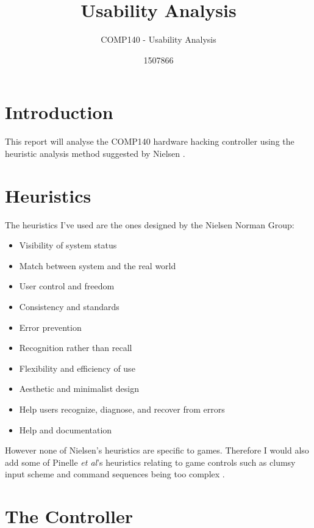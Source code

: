 \documentclass{scrartcl}
\title{Usability Analysis}
\subtitle{COMP140 - Usability Analysis}
\author{1507866}
\begin{document}
	
\maketitle


\section{Introduction}
This report will analyse the COMP140 hardware hacking controller using the heuristic analysis method suggested by Nielsen \cite{HeuristicEvaluation}.


\section{Heuristics}
The heuristics I've used are the ones designed by the Nielsen Norman Group:
\begin{itemize}
	\item Visibility of system status
	\item Match between system and the real world
	\item User control and freedom	
	\item Consistency and standards
	\item Error prevention
	\item Recognition rather than recall
	\item Flexibility and efficiency of use
	\item Aesthetic and minimalist design
	\item Help users recognize, diagnose, and recover from errors	
	\item Help and documentation \cite{NNG}
\end{itemize}

However none of Nielsen's heuristics are specific to games. Therefore I would also add some of Pinelle \textit{et al}'s heuristics relating to game controls such as clumsy input scheme and command sequences being too complex \cite{Pinelle}.

\section{The Controller}
\end{document}
